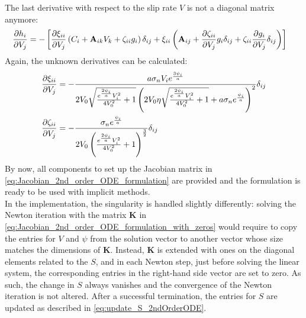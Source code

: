 The last derivative with respect to the slip rate $V$ is not a diagonal matrix anymore:
\begin{align}
	\pdv{h_i}{V_j} &= -\left[\pdv{\xi_{ii}}{V_j}\left(C_i + \mathbf{A}_{ik}V_k + \zeta_{ii}g_i\right)\delta_{ij} + \xi_{ii}\left(\mathbf{A}_{ij} + \pdv{\zeta_{ii}}{V_j}g_i\delta_{ij} + \zeta_{ii}\pdv{g_i}{V_j}\delta_{ij}\right)\right]
\end{align}
Again, the unknown derivatives can be calculated:
\begin{align}
	\pdv{\xi_{ii}}{V_j} &= -\frac{a\sigma_n V_ie^{\frac{3\psi_i}{a}}}{2V_0\sqrt{\frac{e^{\frac{2\psi_i}{a}}V_i^2}{4V_0^2}+1}\left(2V_0\eta\sqrt{\frac{e^{\frac{2\psi_i}{a}}V_i^2}{4V_0^2}+1}+a\sigma_n e^{\frac{\psi_i}{a}}\right)^2}\delta_{ij} \\
	\pdv{\zeta_{ii}}{V_j} &= -\frac{\sigma_n e^{\frac{\psi_i}{a}}}{2V_0\left(\frac{e^{\frac{2\psi_i}{a}}V_i^2}{4V_0^2}+1\right)^{\frac{3}{2}}}\delta_{ij}
\end{align}
By now, all components to set up the Jacobian matrix in \autoref{eq:Jacobian_2nd_order_ODE_formulation} are provided and the formulation is ready to be used with implicit methods. \\
In the implementation, the singularity is handled slightly differently: solving the Newton iteration with the matrix $\mathbf{K}$ in \autoref{eq:Jacobian_2nd_order_ODE_formulation_with_zeros} would require to copy the entries for $V$ and $\psi$ from the solution vector to another vector whose size matches the dimensions of $\mathbf{K}$. Instead, $\mathbf{K}$ is extended with ones on the diagonal elements related to the $S$, and in each Newton step, just before solving the linear system, the corresponding entries in the right-hand side vector are set to zero. As such, the change in $S$ always vanishes and the convergence of the Newton iteration is not altered. After a successful termination, the entries for $S$ are updated as described in \autoref{eq:update_S_2ndOrderODE}.

